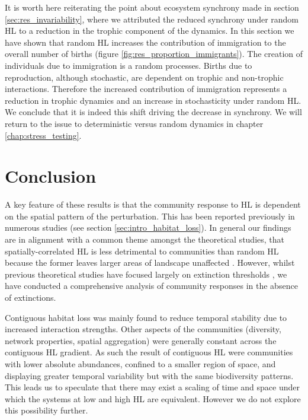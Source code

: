 It is worth here reiterating the point about ecosystem synchrony made in section \ref{sec:res_invariability}, where we attributed the reduced synchrony under random HL to a reduction in the trophic component of the dynamics. In this section we have shown that random HL increases the contribution of immigration to the overall number of births (figure \ref{fig:res_proportion_immigrants}). The creation of individuals due to immigration is a random processes. Births due to reproduction, although stochastic, are dependent on trophic and non-trophic interactions. Therefore the increased contribution of immigration represents a reduction in trophic dynamics and an increase in stochasticity under random HL. We conclude that it is indeed this shift driving the decrease in synchrony. We will return to the issue to deterministic versus random dynamics in chapter \ref{chap:stress_testing}.


\clearpage
\section{Conclusion}
\label{sec:hir_discussion}

A key feature of these results is that the community response to HL is dependent on the spatial pattern of the perturbation. This has been reported previously in numerous studies (see section \ref{sec:intro_habitat_loss}). In general our findings are in alignment with a common theme amongst the theoretical studies, that spatially-correlated HL is less detrimental to communities than random HL because the former leaves larger areas of landscape unaffected \cite{ovaskainen2002metapopulation}. However, whilst previous theoretical studies have focused largely on extinction thresholds \cite{WHAT}, we have conducted a comprehensive analysis of community responses in the absence of extinctions. 

Contiguous habitat loss was mainly found to reduce temporal stability due to increased interaction strengths. Other aspects of the communities (diversity, network properties, spatial aggregation) were generally constant across the contiguous HL gradient. As such the result of contiguous HL were communities with lower absolute abundances, confined to a smaller region of space, and displaying greater temporal variability but with the same biodiversity patterns. This leads us to speculate that there may exist a scaling of time and space under which the systems at low and high HL are equivalent. However we do not explore this possibility further. 

